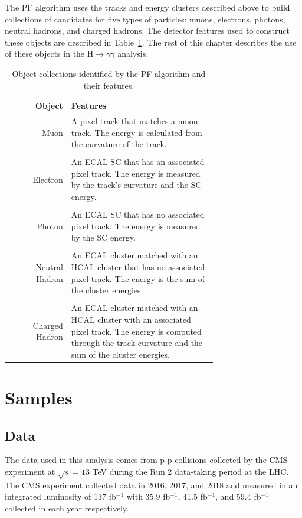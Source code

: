 The PF algorithm uses the tracks and energy clusters described above to build collections of candidates for five types of particles: muons, electrons, photons, neutral hadrons, and charged hadrons. The detector features used to construct these objects are described in Table~\ref{tab:pf_collections}. The rest of this chapter describes the use of these objects in the H$\rightarrow\gamma\gamma$ analysis.

\begin{table}[h]
    \centering
    \begin{tabular}{r | p{0.7\linewidth}}
        Object & Features  \\ \hline \hline
        Muon & A pixel track that matches a muon track. The energy is calculated from the curvature of the track. \\ 
        & \\
        Electron & An ECAL SC that has an associated pixel track. The energy is measured by the track's curvature and the SC energy. \\
        & \\
        Photon & An ECAL SC that has no associated pixel track. The energy is measured by the SC energy. \\
        & \\
        Neutral Hadron & An ECAL cluster matched with an HCAL cluster that has no associated pixel track. The energy is the sum of the cluster energies. \\
        & \\
        Charged Hadron & An ECAL cluster matched with an HCAL cluster with an associated pixel track. The energy is computed through the track curvature and the sum of the cluster energies. \\ \hline
    \end{tabular}
    \caption{Object collections identified by the PF algorithm and their features.}
    \label{tab:pf_collections}
\end{table}

\section{Samples}

\subsection{Data}

The data used in this analysis comes from p-p collisions collected by the CMS experiment at $\sqrt{s} = 13$ TeV during the Run 2 data-taking period at the LHC. The CMS experiment collected data in 2016, 2017, and 2018 and measured in an integrated luminosity of 137 fb$^{-1}$ with 35.9 fb$^{-1}$, 41.5 fb$^{-1}$, and 59.4 fb$^{-1}$ collected in each year respectively.

